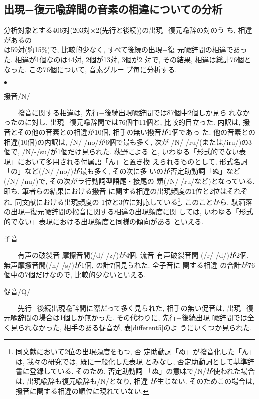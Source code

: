 \subsection{出現−復元喩辞間の音素の相違についての分析}\label{onso-soui}

分析対象とする406対(203対$\times$2(先行と後続))の出現−復元喩辞の対のう
ち, 相違があるの\\は59対(約15\%)で, 比較的少なく, すべて後続の出現−復
元喩辞間の相違であった. 相違が1個なのは44対, 2個が13対, 3個が2
対で, その結果, 相違は総計76個となった. この76個について, 音素グルー
プ毎に分析する.  
\vspace*{1em}

\begin{list}{\Large $\bullet$}{}
\item 撥音/N/

\ \ \ \ 撥音に関する相違は, 先行−後続出現喩辞間では87個中2個しか見ら
れなかったのに対し, 出現−復元喩辞間では76個中11個と, 比較的目立った. 
内訳は, 撥音とその他の音素との相違が10個,  相手の無い撥音が1個であっ
た. 他の音素との相違(10個)の内訳は, /N/-/no/が6個で最も多く, 次が
/N/-/ru/(または/iru/)の3個で, /N/-/su/が1個だけ見られた. 荻野による
と, いわゆる「形式的でない表現」において多用される付属語「ん」と置き換
えられるものとして, 形式名詞「の」など(/N/-/no/)が最も多く, その次に多
いのが否定助動詞「ぬ」など(/N/-/nu/)で, その次がラ行動詞型語尾・接尾の
類(/N/-/ru/など)となっている\cite{Ogino1993}. 即ち, 筆者らの結果における撥音
に関する相違の出現頻度の1位と2位はそれぞれ, 同文献における出現頻度の
1位と3位に対応している\footnote{同文献において2位の出現頻度をもつ, 否
定助動詞「ぬ」が撥音化した「ん」は, 我々の研究では, 既に一般化した表現
とみなし, 否定助動詞として基準辞書に登録している. そのため, 否定助動詞
「ぬ」の意味で/N/が使われた場合は, 出現喩辞も復元喩辞も/N/となり, 相違
が生じない. そのためこの場合は, 撥音に関する相違の順位に現れていない.}. 
このことから, 駄洒落の出現−復元喩辞間の撥音に関する相違の出現頻度に関
しては, いわゆる「形式的でない」表現における出現頻度と同様の傾向がある
といえる.

\item 子音

\ \ \ \ 有声の破裂音-摩擦音間(/d/-/z/)が4個, 流音-有声破裂音間
(/r/-/d/)が2個, 無声摩擦音間(/h/-/s/)が1個, の計7個見られた. 全子音に
関する相違 の合計が76個中の7個だけなので, 比較的少ないといえる.  

\item 促音/Q/

\ \ \ \ 先行−後続出現喩辞間に際だって多く見られた, 相手の無い促音は, 
出現−復元喩辞間の場合は1個しか無かった. その代わりに, 先行−後続出現
喩辞間では全く見られなかった, 相手のある促音が, 表\ref{different5}のよ
うにいくつか見られた.  


\end{list}
